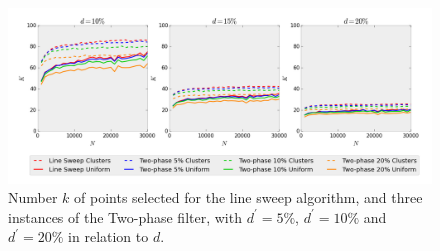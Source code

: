 \begin{figure}[!h] 
	\centering
	\includegraphics[width=\linewidth]{Pictures/ls_bp_k} 
	\caption[Number $k$ of points selected for Line Sweep and Two-phase filter algorithms.]{Number $k$ of points selected for the line sweep algorithm, and three instances of the Two-phase filter, with $d^\prime=5\%$, $d^\prime=10\%$ and $d^\prime=20\%$ in relation to $d$.}
	\label{fig:ls_bp_k} 
\end{figure}